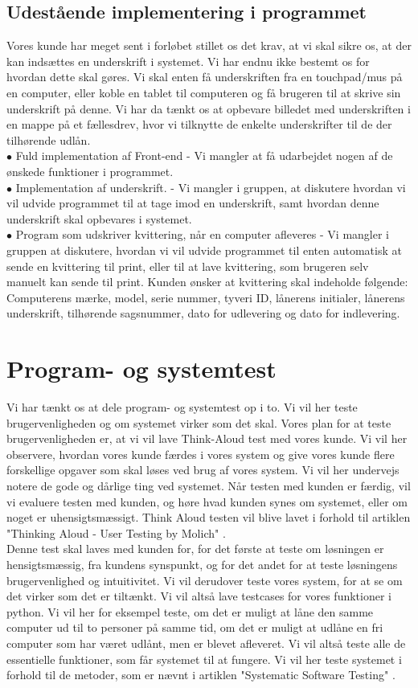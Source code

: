 \documentclass[a4paper]{article}
\begin{document}
\subsection{Udestående implementering i programmet}
Vores kunde har meget sent i forløbet stillet os det krav, at vi skal sikre os, at der kan indsættes en underskrift i systemet. Vi har endnu ikke bestemt os for hvordan dette skal gøres. Vi skal enten få underskriften fra en touchpad/mus på en computer, eller koble en tablet til computeren og få brugeren til at skrive sin underskrift på denne. Vi har da tænkt os at opbevare billedet med underskriften i en mappe på et fællesdrev, hvor vi tilknytte de enkelte underskrifter til de der tilhørende udlån. \\
$\bullet$ Fuld implementation af Front-end - Vi mangler at få udarbejdet nogen af de ønskede funktioner i programmet. \\
$\bullet$ Implementation af underskrift. - Vi mangler i gruppen, at diskutere hvordan vi vil udvide programmet til at tage imod en underskrift, samt hvordan denne underskrift skal opbevares i systemet.\\
$\bullet$ Program som udskriver kvittering, når en computer afleveres - Vi mangler i gruppen at diskutere, hvordan vi vil udvide programmet til enten automatisk at sende en kvittering til print, eller til at lave kvittering, som brugeren selv manuelt kan sende til print. Kunden ønsker at kvittering skal indeholde følgende: Computerens mærke, model, serie nummer, tyveri ID, lånerens initialer, lånerens underskrift, tilhørende sagsnummer, dato for udlevering og dato for indlevering.
\section{Program- og systemtest}
Vi har tænkt os at dele program- og systemtest op i to. Vi vil her teste brugervenligheden og om systemet virker som det skal. Vores plan for at teste brugervenligheden er, at vi vil lave Think-Aloud test med vores kunde. Vi vil her observere, hvordan vores kunde færdes i vores system og give vores kunde flere forskellige opgaver som skal løses ved brug af vores system. Vi vil her undervejs notere de gode og dårlige ting ved systemet. Når testen med kunden er færdig, vil vi evaluere testen med kunden, og høre hvad kunden synes om systemet, eller om noget er uhensigtsmæssigt. Think Aloud testen vil blive lavet i forhold til artiklen "Thinking Aloud - User Testing by Molich" \cite{ThinkAloud}. \\[0.1in]
Denne test skal laves med kunden for, for det første at teste om løsningen er hensigtsmæssig, fra kundens synspunkt, og for det andet for at teste løsningens brugervenlighed og intuitivitet. 
Vi vil derudover teste vores system, for at se om det virker som det er tiltænkt. Vi vil altså lave testcases for vores funktioner i python. Vi vil her for eksempel teste, om det er muligt at låne den samme computer ud til to personer på samme tid, om det er muligt at udlåne en fri computer som har været udlånt, men er blevet afleveret. Vi vil altså teste alle de essentielle funktioner, som får systemet til at fungere. Vi vil her teste systemet i forhold til de metoder, som er nævnt i artiklen "Systematic Software Testing" \cite{SoftwareTest}.
\end{document}
